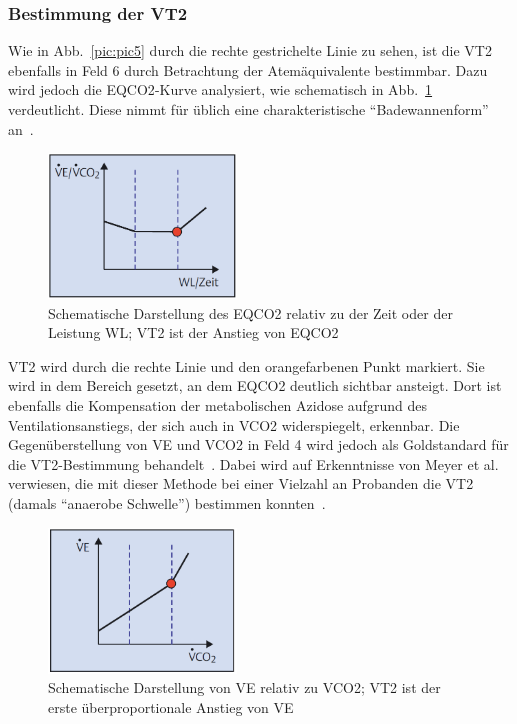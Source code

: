 \subsubsection{Bestimmung der VT2}

Wie in Abb.~\ref{pic:pic5} durch die rechte gestrichelte Linie zu sehen, ist die VT2 ebenfalls in Feld 6 durch Betrachtung der Atemäquivalente bestimmbar. Dazu wird jedoch die \acs{EQCO2}-Kurve analysiert, wie schematisch in Abb.~\ref{pic:pic6} verdeutlicht. Diese nimmt für üblich eine charakteristische "`Badewannenform"' an~\cite{Kroidl.2015}.

\begin{figure}[H]
	\centering
	\includegraphics[width=50mm]{Bilder/eqco2.png}
	\caption[Schematische Darstellung des \acs{EQCO2}]{Schematische Darstellung des \acs{EQCO2} relativ zu der Zeit oder der Leistung \acs{WL}; VT2 ist der Anstieg von \acs{EQCO2}~\cite{Kroidl.2015}}
	\label{pic:pic6}
\end{figure}

VT2 wird durch die rechte Linie und den orangefarbenen Punkt markiert. Sie wird in dem Bereich gesetzt, an dem \acs{EQCO2} deutlich sichtbar ansteigt. Dort ist ebenfalls die Kompensation der metabolischen Azidose aufgrund des Ventilationsanstiegs, der sich auch in \acs{VCO2} widerspiegelt, erkennbar. Die Gegenüberstellung von \acs{VE} und \acs{VCO2} in Feld 4 wird jedoch als Goldstandard für die VT2-Bestimmung behandelt~\cite{ScharhagRosenberger.2013}. Dabei wird auf Erkenntnisse von Meyer et al. verwiesen, die mit dieser Methode bei einer Vielzahl an Probanden die VT2 (damals "`anaerobe Schwelle"') bestimmen konnten~\cite{Meyer.2005}.

\begin{figure}[H]
	\centering
	\includegraphics[width=50mm]{Bilder/field4.png}
	\caption[Schematische Darstellung von \acs{VE} relativ zu \acs{VCO2}]{Schematische Darstellung von \acs{VE} relativ zu \acs{VCO2}; VT2 ist der erste überproportionale Anstieg von \acs{VE}~\cite{Kroidl.2015}}
	\label{pic:pic7}
\end{figure}

